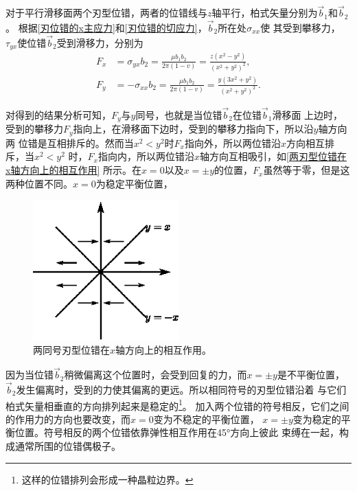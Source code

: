                     对于平行滑移面两个刃型位错，两者的位错线与$z$轴平行，柏式矢量分别为$\vec{b}_1$和$\vec{b}_2$。
                    根据\autoref{刃位错的x主应力}和\autoref{刃位错的切应力}，$\vec{b}_2$所在处$\sigma_{xx}$使
                    其受到攀移力，$\tau_{yx}$使位错$\vec{b}_2$受到滑移力，分别为
                    \begin{align}
                        F_x&=\sigma_{yx}b_2=\frac{\mu b_1b_2}{2\pi(1-v)}=\frac{z(x^2-y^2)}{(x^2+y^2)^2},\\
                        F_y&=-\sigma_{xx}b_2=\frac{\mu b_1b_2}{2\pi(1-v)}=\frac{y(3x^2+y^2)}{(x^2+y^2)^2}.
                    \end{align}

                    对得到的结果分析可知，$F_y$与$y$同号，也就是当位错$\vec{b}_2$在位错$\vec{b}_1$滑移面
                    上边时，受到的攀移力$F_y$指向上，在滑移面下边时，受到的攀移力指向下，所以沿$y$轴方向两
                    位错是互相排斥的。然而当$x^2<y^2$时$F_x$指向外，所以两位错沿$x$方向相互排斥，当$x^2<y^2$
                    时，$F_x$指向内，所以两位错沿$x$轴方向互相吸引，如\autoref{两刃型位错在x轴方向上的相互作用}
                    所示。在$x=0$以及$x=\pm y$的位置，$F_x$虽然等于零，但是这两种位置不同。$x=0$为稳定平衡位置，
                    \begin{figure}[ht]
                        \centering
                        \includegraphics[width=0.5\textwidth]{fig/force_of_edge_dislocations_along_x_axis.eps}
                        \caption{两同号刃型位错在$x$轴方向上的相互作用。}
                        \label{两刃型位错在x轴方向上的相互作用}
                    \end{figure}
                    因为当位错$\vec{b}_2$稍微偏离这个位置时，会受到回复的力，而$x=\pm y$是不平衡位置，
                    $\vec{b}_2$发生偏离时，受到的力使其偏离的更远。所以相同符号的刃型位错沿着
                    与它们柏式矢量相垂直的方向排列起来是稳定的\footnote{这样的位错排列会形成一种晶粒边界。}。
                    加入两个位错的符号相反，它们之间的作用力的方向也要改变，而$x=0$变为不稳定的平衡位置，
                    $x=\pm y$变为稳定的平衡位置。符号相反的两个位错依靠弹性相互作用在\ang{45}方向上彼此
                    束缚在一起，构成通常所围的位错偶极子。

